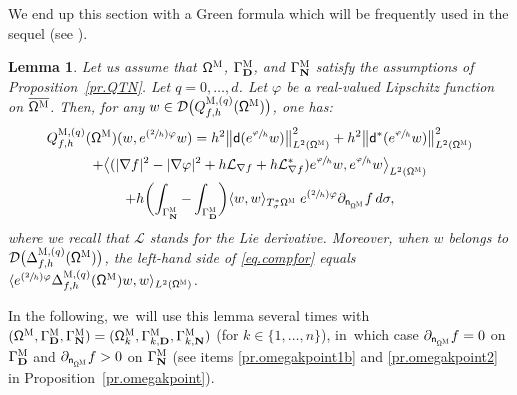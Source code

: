 \documentclass[10pt]{amsart}
\newcommand{\Psfrac}[2]{(\sfrac{#1}{#2})}
\newcommand{\mbf}[1]{\mathbf{#1}}
\theoremstyle{plain}
\newtheorem{lemma}[proposition]{Lemma}
\theoremstyle{definition}
\begin{document}
We end up this section with a Green formula which will be frequently
used in the sequel (see \cite[Lem.\,2.10]{peutrec2020bar}).
\begin{lemma}
\label{le.GreenWeak}
Let us assume that $\mathsf \Omega^{\textsc{M}}$, $\Gamma^{\textsc{M}}_{\mbf D}$, and $\Gamma^{\textsc{M}}_{\mbf N}$ satisfy the assumptions of Proposition~\ref{pr.QTN}. Let $q=0,\ldots,d$.
Let $\varphi$ be a real-valued Lipschitz
function on $\overline{\mathsf \Omega^{\textsc{M}}}$. Then, for any
$w\in \mathcal D\bigl(Q^{\textsc{M},(q)}_{f,h} (\mathsf
\Omega^{\textsc{M}})\bigr)$, one has:\vspace*{-4pt}\enlargethispage{.5\baselineskip}
\begin{multline}
\label{eq.compfor}
{Q}^{\textsc{M},(q)}_{f,h} (\mathsf \Omega^{\textsc{M}})(w,e^{\Psfrac 2h \varphi} w)=
h^{2}\big \| \mathsf d (e^{\sfrac{\varphi}{h}} w)\big \|^{2}_{ L^{2} (\mathsf \Omega^{\textsc{M}})}+
h^{2} \big \| \mathsf d^{*} (e^{\sfrac{\varphi}{h}} w) \big \|^{2}_{ L^{2} (\mathsf \Omega^{\textsc{M}})}\\
+ \big \langle
(|\nabla f|^{2}-|\nabla \varphi|^{2}+h\mathcal{L}_{\nabla
f}+h\mathcal{L}_{\nabla
f}^{*})e^{\sfrac{\varphi}{h}} w, e^{\sfrac{\varphi}{h}}
w\big \rangle_{ L^{2} (\mathsf \Omega^{\textsc{M}})}\\
+h \biggl(\int_{\Gamma^{\textsc{M}}_{\mbf N}} - \int_{\Gamma^{\textsc{M}}_{\mbf D}}\biggr)
\langle w,w
\rangle_{ T_{\sigma}^{*}\mathsf \Omega^{\textsc{M}}}\;e^{\Psfrac{2 }{h}\varphi }\partial_{\mathsf n_{ \mathsf \Omega^{\textsc{M}} } }
f\, d\sigma,
\end{multline}
where we recall that $\mathcal{L}$ stands for the Lie derivative.
Moreover, when $w$ belongs to $\mathcal D\bigl(\Delta_{f,h}^{\textsc{M},(q)} (\mathsf \Omega^{\textsc{M}})\bigr)$, the left-hand
side of \eqref{eq.compfor} equals $\langle
e^{\Psfrac 2h \varphi}\Delta_{f,h}^{\textsc{M},(q)} (\mathsf \Omega^{\textsc{M}}) w,w\rangle_{L^{2} (\mathsf \Omega^{\textsc{M}})}$.
\end{lemma}
In the following, we~will use this lemma several times with $(\mathsf
\Omega^{\textsc{M}}, \Gamma^{\textsc{M}}_{\mbf D},
\Gamma^{\textsc{M}}_{\mbf N}) = (\mathsf \Omega_k^{\textsc{M}},
\Gamma_{k,\mbf D}^{\textsc{M}}, \Gamma_{k,\mbf N}^{\textsc{M}})$ (for
$k \in \{1, \ldots,n\}$), in~which case $\partial_{\mathsf n_{ \mathsf \Omega^{\textsc{M}}}}f=0$ on
$\Gamma^{\textsc{M}}_{\mbf D}$ and $\partial_{\mathsf n_{ \mathsf \Omega^{\textsc{M}}}}f>0$ on
$\Gamma^{\textsc{M}}_{\mbf N}$ (see items \eqref{pr.omegakpoint1b} and \eqref{pr.omegakpoint2} in Proposition~\ref{pr.omegakpoint}).
\end{document}
